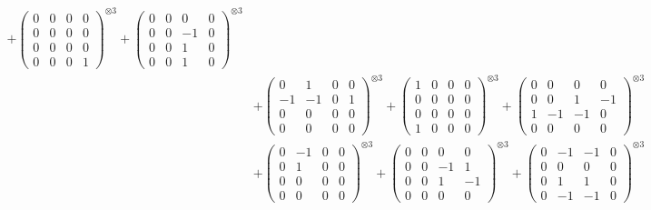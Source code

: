 \documentclass{article}
\begin{document}
{\begin{align}
            + \begin{pmatrix} 0 & 0 & 0 & 0 \\ 0 & 0 & 0 & 0 \\ 0 & 0 & 0 & 0 \\ 0 & 0 & 0 & 1 \end{pmatrix}^{\otimes 3} 
            + \begin{pmatrix} 0 & 0 & 0 & 0 \\ 0 & 0 & -1 & 0 \\ 0 & 0 & 1 & 0 \\ 0 & 0 & 1 & 0 \end{pmatrix}^{\otimes 3} \\
        &+ \label{Rs16-Rc11-Solution-8-c10} \begin{pmatrix} 0 & 1 & 0 & 0 \\ -1 & -1 & 0 & 1 \\ 0 & 0 & 0 & 0 \\ 0 & 0 & 0 & 0 \end{pmatrix}^{\otimes 3} 
            + \begin{pmatrix} 1 & 0 & 0 & 0 \\ 0 & 0 & 0 & 0 \\ 0 & 0 & 0 & 0 \\ 1 & 0 & 0 & 0 \end{pmatrix}^{\otimes 3} 
            + \begin{pmatrix} 0 & 0 & 0 & 0 \\ 0 & 0 & 1 & -1 \\ 1 & -1 & -1 & 0 \\ 0 & 0 & 0 & 0 \end{pmatrix}^{\otimes 3} \\
        &+ \label{Rs16-Rc11-Solution-8-c13} \begin{pmatrix} 0 & -1 & 0 & 0 \\ 0 & 1 & 0 & 0 \\ 0 & 0 & 0 & 0 \\ 0 & 0 & 0 & 0 \end{pmatrix}^{\otimes 3} 
            + \begin{pmatrix} 0 & 0 & 0 & 0 \\ 0 & 0 & -1 & 1 \\ 0 & 0 & 1 & -1 \\ 0 & 0 & 0 & 0 \end{pmatrix}^{\otimes 3} 
            + \begin{pmatrix} 0 & -1 & -1 & 0 \\ 0 & 0 & 0 & 0 \\ 0 & 1 & 1 & 0 \\ 0 & -1 & -1 & 0 \end{pmatrix}^{\otimes 3} \\

\end{align}}
\end{document}
